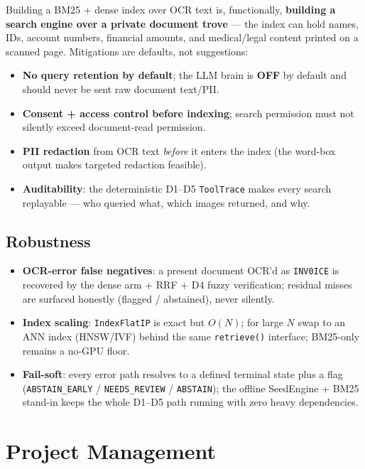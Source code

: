 \documentclass[12pt,a4paper]{article}
\begin{document}
Building a BM25 + dense index over OCR text is, functionally, \textbf{building a search engine over a private document trove} --- the index can hold names, IDs, account numbers, financial amounts, and medical/legal content printed on a scanned page. Mitigations are defaults, not suggestions:
\begin{itemize}\setlength\itemsep{0.12em}
  \item \textbf{No query retention by default}; the LLM brain is \textbf{OFF} by default and should never be sent raw document text/PII.
  \item \textbf{Consent + access control before indexing}; search permission must not silently exceed document-read permission.
  \item \textbf{PII redaction} from OCR text \emph{before} it enters the index (the word-box output makes targeted redaction feasible).
  \item \textbf{Auditability}: the deterministic D1--D5 \texttt{ToolTrace} makes every search replayable --- who queried what, which images returned, and why.
\end{itemize}

\subsection{Robustness}

\begin{itemize}\setlength\itemsep{0.12em}
  \item \textbf{OCR-error false negatives}: a present document OCR'd as \texttt{INV0ICE} is recovered by the dense arm + RRF + D4 fuzzy verification; residual misses are surfaced honestly (flagged / abstained), never silently.
  \item \textbf{Index scaling}: \texttt{IndexFlatIP} is exact but $O(N)$; for large $N$ swap to an ANN index (HNSW/IVF) behind the same \texttt{retrieve()} interface; BM25-only remains a no-GPU floor.
  \item \textbf{Fail-soft}: every error path resolves to a defined terminal state plus a flag (\texttt{ABSTAIN\_EARLY} / \texttt{NEEDS\_REVIEW} / \texttt{ABSTAIN}); the offline SeedEngine + BM25 stand-in keeps the whole D1--D5 path running with zero heavy dependencies.
\end{itemize}

\section{Project Management}
\end{document}
